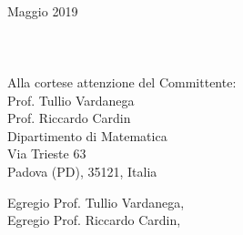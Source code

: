 \documentclass[11pt, a4paper]{letter} %
\begin{document}
	
	
	\begin{letter}{
			\-\\ Maggio 2019	
			\-\\\-\\\-\\\-\\
			Alla cortese attenzione del Committente:	\\
			Prof. Tullio Vardanega\\
			Prof. Riccardo Cardin\\	
			Dipartimento di Matematica\\ 
			Via Trieste 63\\ 
			Padova (PD), 35121, Italia
		}
		
		
		\opening{Egregio Prof.  Tullio Vardanega,\\
			Egregio Prof.  Riccardo Cardin,\\}
		

\end{letter}
\end{document}
